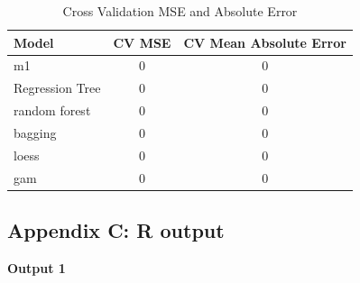 \documentclass[11pt a4paper]{article}
\begin{document}
\begin{table}[H]
	\centering
	\caption{Cross Validation MSE and Absolute Error}
	\begin{tabular}{l|cc}
		\hline
		Model & CV MSE & CV Mean Absolute Error\\
		\hline
		m1 				& 0	& 0 \\
		Regression Tree & 0	& 0 \\
		random forest 	& 0	& 0 \\
		bagging 		& 0	& 0 \\
		loess 			& 0	& 0 \\
		gam 			& 0	& 0 \\
		\hline
	\end{tabular}
	\label{table:mse}
\end{table}



\subsection*{Appendix C: R output}
\noindent\textbf{Output 1}

\end{document}
